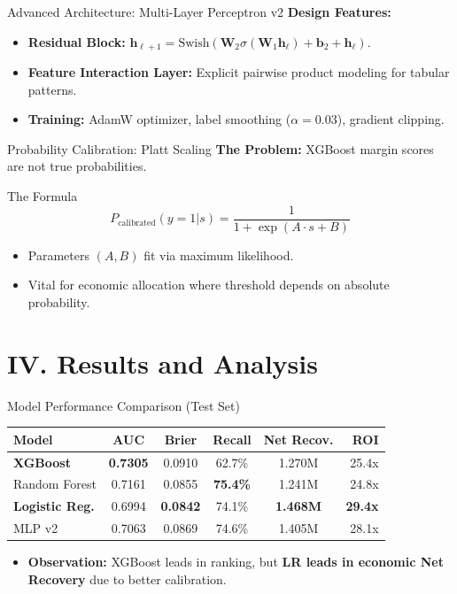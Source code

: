 \documentclass[10pt]{beamer}
\begin{document}
\begin{frame}{\textrm{Advanced Architecture: Multi-Layer Perceptron v2}}
    \textbf{Design Features:}
    \begin{itemize}
        \item \textbf{Residual Block:} $\mathbf{h}_{\ell+1} = \text{Swish}(\mathbf{W}_2 \sigma(\mathbf{W}_1 \mathbf{h}_\ell) + \mathbf{b}_2 + \mathbf{h}_\ell)$.
        \item \textbf{Feature Interaction Layer:} Explicit pairwise product modeling for tabular patterns.
        \item \textbf{Training:} AdamW optimizer, label smoothing ($\alpha=0.03$), gradient clipping.
    \end{itemize}
\end{frame}

\begin{frame}{\textrm{Probability Calibration: Platt Scaling}}
    \textbf{The Problem:} XGBoost margin scores are not true probabilities.
    \begin{block}{The Formula}
        \[ P_{\text{calibrated}}(y=1|s) = \frac{1}{1 + \exp(A \cdot s + B)} \]
    \end{block}
    \begin{itemize}
        \item Parameters $(A, B)$ fit via maximum likelihood.
        \item Vital for economic allocation where threshold depends on absolute probability.
    \end{itemize}
\end{frame}

\section{IV. Results and Analysis}

\begin{frame}{\textrm{Model Performance Comparison (Test Set)}}
\centering
\small
\begin{tabular}{lccccr}
\toprule
\textbf{Model} & \textbf{AUC} & \textbf{Brier} & \textbf{Recall} & \textbf{Net Recov.} & \textbf{ROI}\\
\midrule
\textbf{XGBoost} & \textbf{0.7305} & 0.0910 & 62.7\% & 1.270M & 25.4x\\
Random Forest & 0.7161 & 0.0855 & \textbf{75.4\%} & 1.241M & 24.8x\\
\textbf{Logistic Reg.} & 0.6994 & \textbf{0.0842} & 74.1\% & \textbf{1.468M} & \textbf{29.4x}\\
MLP v2 & 0.7063 & 0.0869 & 74.6\% & 1.405M & 28.1x\\
\bottomrule
\end{tabular}
\vfill
\begin{itemize}
    \item \textbf{Observation:} XGBoost leads in ranking, but \textbf{LR leads in economic Net Recovery} due to better calibration.
\end{itemize}
\end{frame}
\end{document}
